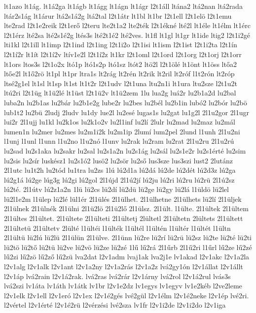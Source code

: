 {lt1azo
lt1ág.
lt1á2ga
lt1ágb
lt1ágg
lt1ágn
lt1ágr
l2t1áll
ltána2
ltá2nan
ltá2rada
ltár2s1ág
lt1árur
ltá2s1á2g
ltá2tal
l2t1átr
lt1bl
lt1br
l2t1ell
l2t1elö
l2t1emu
lte2rad
l2t1e2reik
l2t1erő
l2teru
lte2t1a2
lte2ték
l2t1ékné
lté2l
lt1éle
lt1élm
lt1érc
l2t1érz
lté2sa
lté2s1é2g
ltés3s
lté2t1é2
lté2ves.
lt1fl
lt1gl
lt1gr
lt1ide
ltig2
l2t1i2gé
lti1kl
l2t1ill
lt1imp
l2t1ind
l2t1ing
l2t1i2o
l2t1isi
lt1ism
l2t1ist
l2t1i2ta
l2t1ín
l2t1í2r
lt1ít
l2t1í2v
ltív1e2l
l2t1í2z
lt1kr
l2t1oml
l2t1ord
l2t1org
l2t1orj
l2t1orr
lt1ors
ltos3s
l2t1o2x
ltó1p
ltó1s2p
ltó1sz
ltót2
ltö2l
l2t1ölé
lt1önt
lt1öss
ltőa2
ltőe2l
lt1ő2rö
lt1pl
lt1pr
ltra1s
lt2rág
lt2rén
lt2rik
lt2ril
lt2róf
l1t2rón
lt2róp
ltsé2g1el
lt1sl
lt1sp
lt1st
lt1t2r
l2t1udv
l2t1una
ltu2n1i
lt1ura
ltu2sze
l2t1u2t
ltú2ri
l2t1üg
lt1ü2lé
lt1üst
l2t1ü2v
lt1ü2zem
1lu
lua2g
luá2r
lu2b1a2d
lu2bal
luba2n
lu2b1as
lu2bár
lu2b1e2g
lube2r
lu2bes
lu2bél
lu2b1in
lubó2
lu2bór
lu2bö
lub1t2
lu2bü
2ludj
2ludv
lu1dy
lue2l
lu2esé
lugas1s
lu2gat
lu1g2l
2l1u2gor
2l1ugr
lui2r
2l1ujj
lu1kl
lu2k1os
lu2k1o2v
lu2l1inf
lu2lí
2lulr
lu2mad
lu2maz
lu2mál
lumen1n
lu2mer
lu2mes
lu2m1i2k
lu2m1ip
2lumí
lum2pel
2lund
l1unh
2l1u2ni
l1unj
l1unl
l1unn
l1u2no
l1u2nó
l1unv
lu2rak
lu2ram
lu2rat
2l1u2ru
2l1u2rú
lu2sad
lu2s1aka
lu2sakr
lu2sal
lu2s1a2n
lu2s1ág
lu2sál
lu2s1e2r
lu2s1érté
lu2sim
lu2sis
lu2sír
luskész1
lu2s1ó2
lusö2
lu2sör
lu2ső
lus3sze
lus3szi
lust2
2lutánz
2l1utc
lu1t2h
lu2tód
lu1tra
lu2zs
1lú
lú2d1a
lú2dá
lú2de
lú2dét
lú2d3z
lú2ga
lú2g1á
lú2ge
lúg3g
lú2gi
lú2gol
2l1újd
2l1ú2jí
lú2ju
lú2ri
lú2ru
lú2rü
2l1ú2sz
lú2té.
2l1útv
lú2z1a2n
1lü
lü2cs
lü2dí
lü2dü
lü2ge
lü2gy
lü2lá
l1üldö
lü2lel
lü2l1e2m
l1ülep
lü2lé
lül1ér
2l1ülés
2l1ülhet.
2l1ülhetne
2l1ülhets
lü2lí
2l1üljek
2l1ülnek
2l1ülnék
2l1ülni
2l1ü2lö
2l1ü2lő
2l1ülsz.
2l1ült.
l1ülte.
2l1ültek
2l1ültem
2l1ültes
2l1ültet.
2l1ültete
2l1ülteti
2l1ültetj
2lültetl
2l1ültetn
2lültets
2l1ültett
2l1ültetü
2l1ültetv
2lülté
l1ültéi
l1ülték
l1ültél
l1ültén
l1ültér
l1ültét
l1ültn
2l1ültü
lü2lú
lü2lü
2l1ülün
2l1ülve.
2l1ünn
lü2re
lü2rí
lü2rü
lü2sz
lü2te
lü2té
lü2ti
lü2tö
lü2tő
lü2tü
lü2ve
lü2vö
lü2ze
lü2zé
1lű
lű2rá
2l1űrb
2l1ű2ri
l1űrl
lű2ze
lű2zé
lű2zi
lű2zö
lű2ző
lű2zü
lva2dat
l2v1adm
lvaj1ak
lva2j1e
lv1akad
l2v1akc
l2v1a2la
l2v1alg
l2v1alk
l2v1ant
l2v1a2ny
l2v1a2rás
l2v1a2z
lvá2gy1ón
l2v1állat
l2v1állt
l2v1áp
lvá2rain
l2v1á2rak.
lvá2ras
lvá2rár
l2v1árny
lvá2rol
l2v1á2rul
lvás3s
lvá2szi
lv1áta
lv1áth
lv1átk
lv1br
l2v1e2dz
lv1egys
lv1egyv
lv1e2kéb
l2ve2leme
l2v1elk
l2v1ell
l2v1eró
l2v1ex
l2v1é2gés
lvé2gül
l2v1élm
l2v1é2neke
l2v1ép
lvé2ri.
l2vértel
l2v1érté
l2v1é2rü
l2vérzési
lvé2sza
lv1fr
l2v1i2de
l2v1i2do
l2v1iga
}
